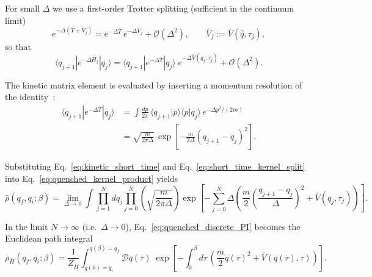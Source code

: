 \documentclass[aps,prl,twocolumn,superscriptaddress,showpacs,floatfix]{revtex4-2}
\begin{document}
For small $\Delta$ we use a first-order Trotter splitting (sufficient in the continuum
limit)~\cite{kleinertPathIntegralsQuantum2009}
\begin{equation}
    e^{-\Delta(\bar T+\bar V_j)}
    =
    e^{-\Delta \bar T}\,e^{-\Delta \bar V_j}
    +\mathcal O(\Delta^2),
    \qquad
    \bar V_j:=\bar V(\hat q,\tau_j),
    \label{eq:trotter_split}
\end{equation}
so that
\begin{equation}
    \langle q_{j+1}|e^{-\Delta \bar H_j}|q_j\rangle
    =
    \langle q_{j+1}|e^{-\Delta \bar T}|q_j\rangle\;
    e^{-\Delta \bar V(q_j,\tau_j)}
    +\mathcal O(\Delta^2).
    \label{eq:short_time_kernel_split}
\end{equation}

The kinetic matrix element is evaluated by inserting a momentum resolution of
the identity~\cite{feynmanQuantumMechanicsPath1965,schulmanTechniquesApplicationsPath1981}:
\begin{align}
    \langle q_{j+1}|e^{-\Delta \bar T}|q_j\rangle
    &=
    \int \frac{dp}{2\pi}\,
    \langle q_{j+1}|p\rangle\langle p|q_j\rangle\,e^{-\Delta p^2/(2m)}
    \nonumber\\
    &=
    \sqrt{\frac{m}{2\pi\Delta}}\,
    \exp\!\left[-\frac{m}{2\Delta}(q_{j+1}-q_j)^2\right].
    \label{eq:kinetic_short_time}
\end{align}
\begin{widetext}
Substituting Eq.~\eqref{eq:kinetic_short_time} and Eq.~\eqref{eq:short_time_kernel_split} into
Eq.~\eqref{eq:quenched_kernel_product} yields
\begin{equation}
    \bar\rho(q_f,q_i;\beta)
    =
    \lim_{\Delta\to 0}
    \int \prod_{j=1}^{N} dq_j
    \prod_{j=0}^{N}
    \left(\sqrt{\frac{m}{2\pi\Delta}}\right)
    \exp\!\left[
        -\sum_{j=0}^{N}
        \Delta\left(
            \frac{m}{2}\left(\frac{q_{j+1}-q_j}{\Delta}\right)^2
            +\bar V(q_j,\tau_j)
        \right)
    \right].
    \label{eq:quenched_discrete_PI}
\end{equation}

In the limit $N\to\infty$ (i.e.\ $\Delta\to 0$), Eq.~\eqref{eq:quenched_discrete_PI} becomes the
Euclidean path integral~\cite{feynmanQuantumMechanicsPath1965,kleinertPathIntegralsQuantum2009,groscheHandbookFeynmanPath1998}
\begin{equation}
    \rho_{\bar H}(q_f,q_i;\beta)
    =
    \frac{1}{Z_{\bar H}}
    \int_{q(0)=q_i}^{q(\beta)=q_f}\!\!\mathcal D q(\tau)\;
    \exp\!\left[
        -\int_0^\beta d\tau\,
        \left(
            \frac{m}{2}\dot q(\tau)^2+\bar V(q(\tau),\tau)
        \right)
    \right].
    \label{eq:quenched_continuum_PI}
\end{equation}
\end{widetext}
\end{document}

